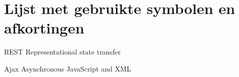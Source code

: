 
\section*{Lijst met gebruikte symbolen en afkortingen}

\begin{abbreviations}
\item[REST] Representational state transfer
\item[Ajax] Asynchronous JavaScript and XML
\end{abbreviations}
